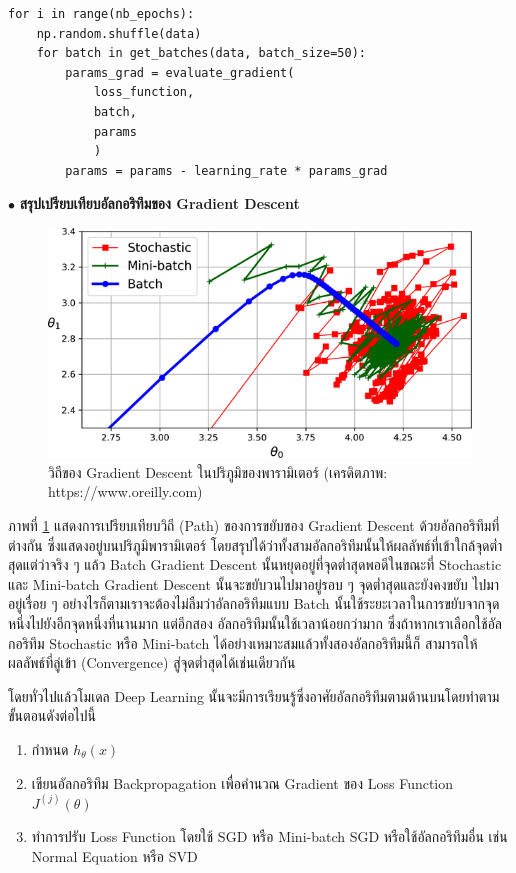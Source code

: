 \begin{lstlisting}[style=MyPython]
for i in range(nb_epochs):
    np.random.shuffle(data)
    for batch in get_batches(data, batch_size=50):
        params_grad = evaluate_gradient(
            loss_function, 
            batch, 
            params
            )
        params = params - learning_rate * params_grad
\end{lstlisting}

\vspace{1em}
\noindent $\bullet$ \textbf{สรุปเปรียบเทียบอัลกอริทึมของ Gradient Descent}

\begin{figure}[htbp]
    \centering
    \includegraphics[width=0.9\linewidth]{fig/gradient_descent_path.png}
    \caption{วิถีของ Gradient Descent ในปริภูมิของพารามิเตอร์ (เครดิตภาพ: https://www.oreilly.com)}
    \label{fig:gradient_descent_path}
\end{figure}

ภาพที่ \ref{fig:gradient_descent_path} แสดงการเปรียบเทียบวิถี (Path) ของการขยับของ Gradient Descent ด้วยอัลกอริทึมที่ต่างกัน
ซึ่งแสดงอยู่บนปริภูมิพารามิเตอร์ โดยสรุปได้ว่าทั้งสามอัลกอริทึมนั้นให้ผลลัพธ์ที่เข้าใกล้จุดต่ำสุดแต่ว่าจริง ๆ แล้ว Batch Gradient Descent 
นั้นหยุดอยู่ที่จุดต่ำสุดพอดีในขณะที่ Stochastic และ Mini-batch Gradient Descent นั้นจะขยับวนไปมาอยู่รอบ ๆ จุดต่ำสุดและยังคงขยับ%
ไปมาอยู่เรื่อย ๆ อย่างไรก็ตามเราจะต้องไม่ลืมว่าอัลกอริทึมแบบ Batch นั้นใช้ระยะเวลาในการขยับจากจุดหนึ่งไปยังอีกจุดหนึ่งที่นานมาก แต่อีกสอง%
อัลกอริทึมนั้นใช้เวลาน้อยกว่ามาก ซึ่งถ้าหากเราเลือกใช้อัลกอริทึม Stochastic หรือ Mini-batch ได้อย่างเหมาะสมแล้วทั้งสองอัลกอริทึมนี้ก็%
สามารถให้ผลลัพธ์ที่ลู่เข้า (Convergence) สู่จุดต่ำสุดได้เช่นเดียวกัน

โดยทั่วไปแล้วโมเดล Deep Learning นั้นจะมีการเรียนรู้ซึ่งอาศัยอัลกอริทึมตามด้านบนโดยทำตามขั้นตอนดังต่อไปนี้

\begin{enumerate}[topsep=0pt,noitemsep]
    \item กำหนด $h_\theta(x)$
    
    \item เขียนอัลกอริทึม Backpropagation เพื่อคำนวณ Gradient ของ Loss Function $J^{(j)}(\theta)$
    
    \item ทำการปรับ Loss Function โดยใช้ SGD หรือ Mini-batch SGD หรือใช้อัลกอริทึมอื่น เช่น Normal Equation หรือ SVD
\end{enumerate}

